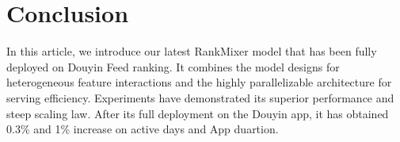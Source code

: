 \section{Conclusion}
\label{sec:conclusion}
In this article, we introduce our latest RankMixer model that has been fully deployed on Douyin Feed ranking. It combines the model designs for heterogeneous feature
interactions and the highly parallelizable architecture for serving efficiency. Experiments have demonstrated its superior performance and steep scaling law. After its full deployment on the Douyin app, it has obtained 0.3\% and  1\% increase on active days and App duartion.